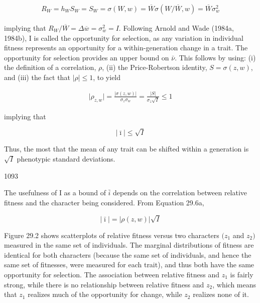\documentclass{article}
\begin{document}
\begin{equation}
\begin{align*}R_W=h_WS_W=S_W=\sigma(W,w)=\overline{W}\sigma(W/\overline{W},w)=\overline{W}\sigma_w^2\end{align*}
\end{equation}

implying that  $ R_W / \overline{W} = \Delta \overline{w} = \sigma_w^2 = I $. Following Arnold and Wade (1984a, 1984b), I is called the opportunity for selection, as any variation in individual fitness represents an opportunity for a within-generation change in a trait. The opportunity for selection provides an upper bound on  $ \bar{\nu} $. This follows by using: (i) the definition of a correlation,  $ \rho $, (ii) the Price-Robertson identity,  $ S = \sigma(z, w) $, and (iii) the fact that  $ |\rho| \leq 1 $, to yield

\begin{equation}
\begin{align*}\mid\rho_{z,w}\mid=\frac{\lvert\sigma(z,w)\rvert}{\sigma_{z}\sigma_{w}}=\frac{\lvert S\rvert}{\sigma_{z}\sqrt{I}}\leq1\end{align*}
\tag{29.6a}
\label{eq:29_6a}
\end{equation}

implying that

\begin{equation}
|\bar{\imath}|\leq\sqrt{I}
\tag{29.6b}
\label{eq:29_6b}
\end{equation}

Thus, the most that the mean of any trait can be shifted within a generation is  $ \sqrt{I} $ phenotypic standard deviations.

1093

The usefulness of I as a bound of  $ \bar{i} $ depends on the correlation between relative fitness and the character being considered. From Equation 29.6a,

\begin{equation}
|\bar{\imath}|=|\rho(z,w)|\sqrt{I}
\tag{29.6c}
\label{eq:29_6c}
\end{equation}

Figure 29.2 shows scatterplots of relative fitness versus two characters  $ (z_{1} $ and  $ z_{2}) $ measured in the same set of individuals. The marginal distributions of fitness are identical for both characters (because the same set of individuals, and hence the same set of fitnesses, were measured for each trait), and thus both have the same opportunity for selection. The association between relative fitness and  $ z_{1} $ is fairly strong, while there is no relationship between relative fitness and  $ z_{2} $, which means that  $ z_{1} $ realizes much of the opportunity for change, while  $ z_{2} $ realizes none of it.
\end{document}
